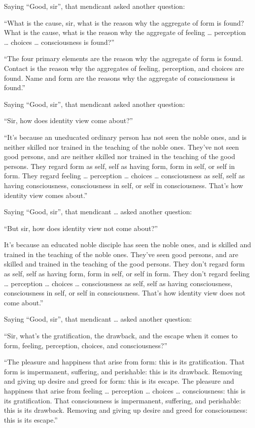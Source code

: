 \documentclass[12pt,openany]{book}%
\begin{document}
Saying “Good, sir”, that mendicant asked another question: 

“What is the cause, sir, what is the reason why the aggregate of form is found? What is the cause, what is the reason why the aggregate of feeling … perception … choices … consciousness is found?” 

“The four primary elements are the reason why the aggregate of form is found. Contact is the reason why the aggregates of feeling, perception, and choices are found. Name and form are the reasons why the aggregate of consciousness is found.” 

Saying “Good, sir”, that mendicant asked another question: 

“Sir, how does identity view come about?” 

“It’s because an uneducated ordinary person has not seen the noble ones, and is neither skilled nor trained in the teaching of the noble ones. They’ve not seen good persons, and are neither skilled nor trained in the teaching of the good persons. They regard form as self, self as having form, form in self, or self in form. They regard feeling … perception … choices … consciousness as self, self as having consciousness, consciousness in self, or self in consciousness. That’s how identity view comes about.” 

Saying “Good, sir”, that mendicant … asked another question: 

“But sir, how does identity view not come about?” 

It’s because an educated noble disciple has seen the noble ones, and is skilled and trained in the teaching of the noble ones. They’ve seen good persons, and are skilled and trained in the teaching of the good persons. They don’t regard form as self, self as having form, form in self, or self in form. They don’t regard feeling … perception … choices … consciousness as self, self as having consciousness, consciousness in self, or self in consciousness. That’s how identity view does not come about.” 

Saying “Good, sir”, that mendicant … asked another question: 

“Sir, what’s the gratification, the drawback, and the escape when it comes to form, feeling, perception, choices, and consciousness?” 

“The pleasure and happiness that arise from form: this is its gratification. That form is impermanent, suffering, and perishable: this is its drawback. Removing and giving up desire and greed for form: this is its escape. The pleasure and happiness that arise from feeling … perception … choices … consciousness: this is its gratification. That consciousness is impermanent, suffering, and perishable: this is its drawback. Removing and giving up desire and greed for consciousness: this is its escape.” 
\end{document}
